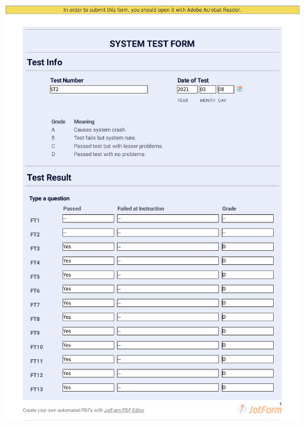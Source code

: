 \documentclass{article}
\begin{document}
 
 \begin{figure}
     \centering
     \includegraphics[width=13cm]{images/2021-03-08_Malte_ST2-1}
     \renewcommand\figurename{Figure}
     \label{fig:my_label}
 \end{figure}
 
\end{document}
